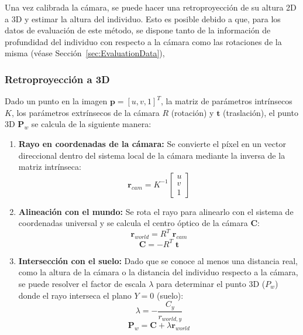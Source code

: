 Una vez calibrada la cámara, se puede hacer una retroproyección de su altura 2D a 3D y estimar la altura del individuo.
Esto es posible debido a que, para los datos de evaluación de este método, se dispone
tanto de la información de profundidad del individuo con respecto a la cámara como las rotaciones de la misma (véase Sección~\ref{sec:EvaluationData}),

\subsubsection*{Retroproyección a 3D}
Dado un punto en la imagen $\mathbf{p} = [u, v, 1]^T$, la matriz de parámetros intrínsecos $K$, los parámetros extrínsecos de la cámara $R$ (rotación) y $\mathbf{t}$ (traslación), el punto 3D $\mathbf{P}_w$ se calcula de la siguiente manera:
\begin{enumerate}
    \item \textbf{Rayo en coordenadas de la cámara:} Se convierte el píxel en un vector direccional dentro del sistema local de la cámara mediante la inversa de la matriz intrínseca:
    \[ \mathbf{r}_{cam} = K^{-1} \begin{bmatrix} u \\ v \\ 1 \end{bmatrix} \]
    \item \textbf{Alineación con el mundo:} Se rota el rayo para alinearlo con el sistema de coordenadas universal y se calcula el centro óptico de la cámara $\mathbf{C}$:
    \[ \mathbf{r}_{world} = R^T \; \mathbf{r}_{cam} \]
    \[ \mathbf{C} = -R^T\;\mathbf{t} \]
    \item \textbf{Intersección con el suelo:} Dado que se conoce al menos una distancia real, como la altura de la cámara o la distancia del individuo respecto a la cámara, se puede resolver el factor de escala $\lambda$ para determinar el punto 3D ($P_w$) donde el rayo interseca el plano $Y=0$ (suelo):
    \[ \lambda = -\frac{C_y}{r_{world, y}} \]
    \[ \mathbf{P}_w = \mathbf{C} + \lambda \mathbf{r}_{world} \]
\end{enumerate}

